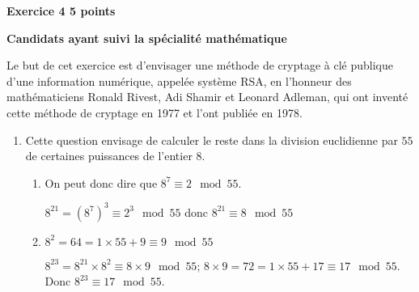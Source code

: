 \documentclass[10pt]{article}
\begin{document}
\textbf{\large{Exercice 4} \hfill 5 points}
 
\textbf{Candidats ayant suivi la spécialité mathématique}

\medskip

Le but de cet exercice est d'envisager une méthode de cryptage à clé publique d'une information numérique, appelée système RSA, en l'honneur des mathématiciens Ronald Rivest, Adi Shamir et Leonard Adleman, qui ont inventé cette méthode de cryptage en 1977 et l'ont publiée en 1978.

%

\medskip

\begin{enumerate}
\item Cette question envisage de calculer le reste dans la division euclidienne par $55$ de certaines puissances de l'entier $8$.
	\begin{enumerate}
		\item %

On peut donc dire que $8^7 \equiv 2 \mod 55$.		
		

$8^{21} = \left (8^7\right )^{3} \equiv 2^3 \mod 55$ donc $8^{21} \equiv 8 \mod 55$

		\item%
		
$8^2 = 64 = 1\times 55+9 \equiv 9 \mod 55$

$8^{23} = 8^{21} \times 8^2 \equiv 8\times 9 \mod 55$;
$8\times 9 = 72 = 1\times 55+17 \equiv 17\mod 55$.
Donc $8^{23} \equiv 17 \mod 55$.


\end{enumerate}
\end{enumerate}
\end{document}
